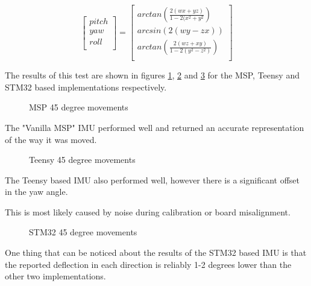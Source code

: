 \documentclass{entcs}
\begin{document}
\begin{equation}
  \left[
    \begin{array}{c}
      pitch\\
      yaw\\
      roll\\
    \end{array}
  \right]
  =
  \left[
    \begin{array}{c}
      arctan\left(\frac{2(wx+yz)}{1-2(x^{2}+y^{2}}\right)\\
      arcsin\left(2(wy-zx)\right)\\
      arctan\left(\frac{2(wz+xy)}{1-2(y^{2}-z^{2})}\right)\\
    \end{array}
  \right]
  \label{eq:quat_to_ypr}
\end{equation}

The results of this test are shown in figures \ref{fig:45_deg_movements_msp},
\ref{fig:45_deg_movements_teensy} and \ref{fig:45_deg_movements_stm32} for the
MSP, Teensy and STM32 based implementations respectively.

\begin{figure}[h!]
  \centering
  \scalebox{0.7}{}
  \caption{MSP 45 degree movements}
  \label{fig:45_deg_movements_msp}
\end{figure}

The "Vanilla MSP" IMU performed well and returned an accurate representation of
the way it was moved.

\begin{figure}[h!]
  \centering
  \scalebox{0.7}{}
  \caption{Teensy 45 degree movements}
  \label{fig:45_deg_movements_teensy}
\end{figure}

The Teensy based IMU also performed well, however there is a significant offset
in the yaw angle.

This is most likely caused by noise during calibration or board misalignment.

\begin{figure}[h!]
  \centering
  \scalebox{0.7}{}
  \caption{STM32 45 degree movements}
  \label{fig:45_deg_movements_stm32}
\end{figure}

One thing that can be noticed about the results of the STM32 based IMU is that
the reported deflection in each direction is reliably 1-2 degrees lower than the
other two implementations.
\end{document}
